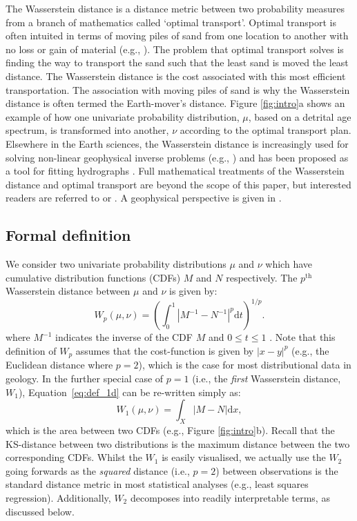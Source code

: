 \documentclass[gchron, manuscript]{copernicus}
\begin{document}
The Wasserstein distance is a distance metric between two probability measures from a branch of mathematics called `optimal transport'. Optimal transport is often intuited in terms of moving piles of sand from one location to another with no loss or gain of material (e.g., \citealt{villani_topics_2003}). The problem that optimal transport solves is finding the way to transport the sand such that the least sand is moved the least distance. The Wasserstein distance is the cost associated with this most efficient transportation. The association with moving piles of sand is why the Wasserstein distance is often termed the Earth-mover's distance. Figure \ref{fig:intro}a shows an example of how one univariate probability distribution, $\mu$, based on a detrital age spectrum, is transformed into another, $\nu$ according to the optimal transport plan. Elsewhere in the Earth sciences, the Wasserstein distance is increasingly used for solving non-linear geophysical inverse problems (e.g., \citealt{engquist_application_2014,metivier_optimal_2016,sambridge_geophysical_2022}) and has been proposed as a tool for fitting hydrographs \citep{magyar_hydrological_2023}. Full mathematical treatments of the Wasserstein distance and optimal transport are beyond the scope of this paper, but interested readers are referred to \cite{villani_topics_2003} or \cite{peyre_computational_2019}. A geophysical perspective is given in \cite{sambridge_geophysical_2022}. 

\subsection{Formal definition}

We consider two univariate probability distributions $\mu$ and $\nu$ which have cumulative distribution functions (CDFs) $M$ and $N$ respectively. The $p^{\mathrm{th}}$ Wasserstein distance between $\mu$ and $\nu$ is given by: 
\begin{equation}
        W_p(\mu, \nu) = \left(\int_0^1 | M^{-1} - N^{-1} |^p \mathrm{d}t\right)^{1/p}. 
    \label{eq:def_1d}
\end{equation} 
\noindent where $M^{-1}$ indicates the inverse of the CDF $M$ and $0 \leq t \leq 1$ \citep{villani_topics_2003}. Note that this definition of $W_p$ assumes that the cost-function is given by $|x-y|^p$ (e.g., the Euclidean distance where $p=2$), which is the case for most distributional data in geology. In the further special case of $p=1$ (i.e., the \textit{first} Wasserstein distance, $W_1$), Equation~\ref{eq:def_1d} can be re-written simply as: 
\begin{equation}
        W_1 (\mu, \nu) = \int_X | M - N| \mathrm{d}x, 
    \label{eq:def_1d_ecdf}
\end{equation} 
\noindent which is the area between two CDFs (e.g., Figure \ref{fig:intro}b). Recall that the KS-distance between two distributions is the maximum distance between the two corresponding CDFs. Whilst the $W_1$ is easily visualised, we actually use the $W_2$ going forwards as the \textit{squared} distance (i.e., $p=2$) between observations is the standard distance metric in most statistical analyses (e.g., least squares regression). Additionally, $W_2$ decomposes into readily interpretable terms, as discussed below. 
\end{document}
